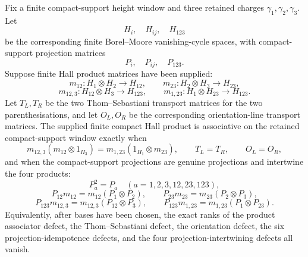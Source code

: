 \begin{proposition}
\label{prop:finite-compact-hall-product-gate}
Fix a finite compact-support height window and three retained charges
\(\gamma_1,\gamma_2,\gamma_3\). Let
\[
 H_i,\quad H_{ij},\quad H_{123}
\]
be the corresponding finite Borel--Moore vanishing-cycle spaces, with
compact-support projection matrices
\[
 P_i,\quad P_{ij},\quad P_{123}.
\]
Suppose finite Hall product matrices have been supplied:
\[
 m_{12}\colon H_1\otimes H_2\to H_{12},\qquad
 m_{23}\colon H_2\otimes H_3\to H_{23},
\]
\[
 m_{12,3}\colon H_{12}\otimes H_3\to H_{123},\qquad
 m_{1,23}\colon H_1\otimes H_{23}\to H_{123}.
\]
Let \(T_L,T_R\) be the two Thom--Sebastiani transport matrices for
the two parenthesisations, and let \(O_L,O_R\) be the corresponding
orientation-line transport matrices. The supplied finite compact Hall
product is associative on the retained compact-support window exactly
when
\[
 m_{12,3}(m_{12}\otimes 1_{H_3})
 =
 m_{1,23}(1_{H_1}\otimes m_{23}),
 \qquad
 T_L=T_R,\qquad O_L=O_R,
\]
and when the compact-support projections are genuine projections and
intertwine the four products:
\[
 P_a^2=P_a\quad
 (a=1,2,3,12,23,123),
\]
\[
 P_{12}m_{12}=m_{12}(P_1\otimes P_2),\qquad
 P_{23}m_{23}=m_{23}(P_2\otimes P_3),
\]
\[
 P_{123}m_{12,3}=m_{12,3}(P_{12}\otimes P_3),\qquad
 P_{123}m_{1,23}=m_{1,23}(P_1\otimes P_{23}).
\]
Equivalently, after bases have been chosen, the exact ranks of the
product associator defect, the Thom--Sebastiani defect, the
orientation defect, the six projection-idempotence defects, and the
four projection-intertwining defects all vanish.
\end{proposition}

